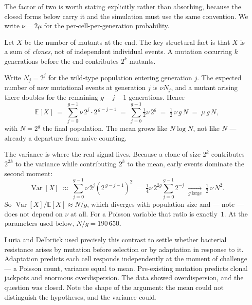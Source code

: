 The factor of two is worth stating explicitly rather than absorbing, because the
closed forms below carry it and the simulation must use the same convention. We
write $\nu = 2\mu$ for the per-cell-per-generation probability.

Let $X$ be the number of mutants at the end. The key structural fact is that $X$
is a sum of \emph{clones}, not of independent individual events. A mutation
occurring $k$ generations before the end contributes $2^{k}$ mutants.

Write $N_j = 2^{j}$ for the wild-type population entering generation $j$. The
expected number of new mutational events at generation $j$ is $\nu N_j$, and a
mutant arising there doubles for the remaining $g - j - 1$ generations. Hence
\begin{equation}\label{eq:ldmean}
  \mathbb{E}[X] \;=\; \sum_{j=0}^{g-1} \nu\,2^{j}\cdot 2^{\,g-j-1}
  \;=\; \sum_{j=0}^{g-1} \tfrac{1}{2}\nu\,2^{g}
  \;=\; \tfrac{1}{2}\,\nu\, g\, N \;=\; \mu\,g\,N,
\end{equation}
with $N = 2^{g}$ the final population. The mean grows like $N\log N$, not like
$N$ --- already a departure from naive counting.

The variance is where the real signal lives. Because a clone of size $2^{k}$
contributes $2^{2k}$ to the variance while contributing $2^{k}$ to the mean,
early events dominate the second moment:
\begin{equation}\label{eq:ldvar}
  \operatorname{Var}[X] \;\approx\; \sum_{j=0}^{g-1} \nu\,2^{j}\left(2^{\,g-j-1}\right)^{2}
  \;=\; \tfrac{1}{4}\nu\,2^{2g}\sum_{j=0}^{g-1} 2^{-j}
  \;\xrightarrow[g\ \text{large}]{}\; \tfrac{1}{2}\,\nu\,N^{2}.
\end{equation}
So $\operatorname{Var}[X]/\mathbb{E}[X] \approx N/g$, which diverges with
population size and --- note --- does not depend on $\nu$ at all. For a Poisson
variable that ratio is exactly~$1$. At the parameters used below,
$N/g = 190\,650$.

\begin{remark}
Luria and Delbrück used precisely this contrast to settle whether bacterial
resistance arises by mutation before selection or by adaptation in response to
it. Adaptation predicts each cell responds independently at the moment of
challenge --- a Poisson count, variance equal to mean. Pre-existing mutation
predicts clonal jackpots and enormous overdispersion. The data showed
overdispersion, and the question was closed. Note the shape of the argument: the
mean could not distinguish the hypotheses, and the variance could.
\end{remark}

